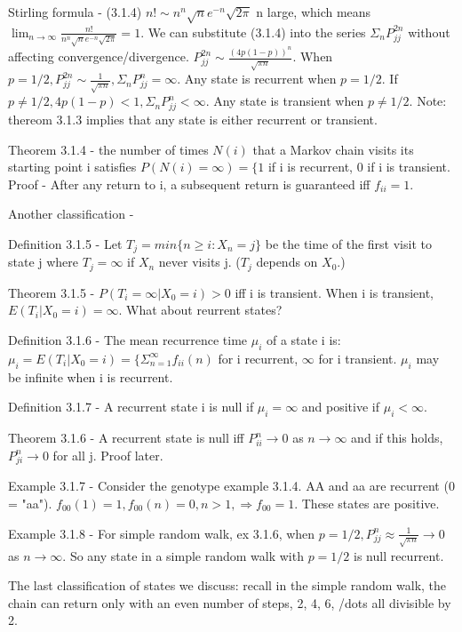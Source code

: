 \documentclass{article}
\begin{document}
Stirling formula - (3.1.4) $n! \sim n^n \sqrt{n} e^{-n} \sqrt{2 \pi}$ n large, which means $\lim_{n\rightarrow \infty} \frac{n!}{n^n \sqrt{n} e^{-n} \sqrt{2 \pi}} = 1$. We can substitute (3.1.4) into the series $\Sigma_n P_{jj}^{2n}$ without affecting convergence/divergence. $P_{jj}^{2n} \sim \frac{(4p(1-p))^n}{\sqrt{\pi n}}$. When $p=1/2, P_{jj}^{2n} \sim \frac{1}{\sqrt{\pi n}}, \Sigma_n P_{jj}^n = \infty$. Any state is recurrent when $p=1/2$. If $p \ne 1/2, 4p(1-p) < 1, \Sigma_n P_{jj}^n < \infty$. Any state is transient when $p \ne 1/2$. Note: thereom 3.1.3 implies that any state is either recurrent or transient.

Theorem 3.1.4 - the number of times $N(i)$ that a Markov chain visits its starting point i satisfies $P(N(i)=\infty) = \{1$ if i is recurrent, 0 if i is transient. Proof - After any return to i, a subsequent return is guaranteed iff $f_{ii}=1$.

Another classification -

Definition 3.1.5 - Let $T_j = min\{n \ge i: X_n=j\}$ be the time of the first visit to state j where $T_j=\infty$ if $X_n$ never visits j. ($T_j$ depends on $X_0$.)

Theorem 3.1.5 - $P(T_i=\infty | X_0=i) > 0$ iff i is transient. When i is transient, $E(T_i|X_0=i) = \infty$. What about reurrent states?

Definition 3.1.6 - The mean recurrence time $\mu_i$ of a state i is: $\mu_i = E(T_i|X_0=i) = \{\Sigma_{n=1}^{\infty} f_{ii} (n)$ for i recurrent, $\infty$ for i transient. $\mu_i$ may be infinite when i is recurrent.

Definition 3.1.7 - A recurrent state i is null if $\mu_i = \infty$ and positive if $\mu_i < \infty$.

Theorem 3.1.6 - A recurrent state is null iff $P_{ii}^n \rightarrow 0$ as $n \rightarrow \infty$ and if this holds, $P_{ji}^n \rightarrow 0$ for all j. Proof later.

Example 3.1.7 - Consider the genotype example 3.1.4. AA and aa are recurrent (0 = "aa"). $f_{00}(1) = 1, f_{00}(n)=0, n > 1, \Rightarrow f_{00} = 1$. These states are positive.

Example 3.1.8 - For simple random walk, ex 3.1.6, when $p = 1/2, P_{jj}^n \approx \frac{1}{\sqrt{\pi n}} \rightarrow 0$ as $n \rightarrow \infty$. So any state in a simple random walk with $p = 1/2$ is null recurrent.

The last classification of states we discuss: recall in the simple random walk, the chain can return only with an even number of steps, 2, 4, 6, /dots all divisible by 2.
\end{document}
